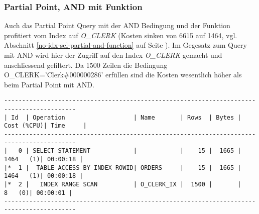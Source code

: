 \documentclass[11pt,a4paper,parskip=half]{scrartcl}
\begin{document}
\subsubsection{Partial Point, AND mit Funktion}
Auch das Partial Point Query mit der AND Bedingung und der Funktion profitiert vom  Index auf \emph{O\_CLERK} (Kosten sinken von 6615 auf 1464, vgl. Abschnitt \ref{no-idx-sel-partial-and-function} auf Seite \pageref{no-idx-sel-partial-and-function}). Im Gegesatz zum Query mit AND wird hier der Zugriff auf den Index \emph{O\_CLERK} gemacht und anschliessend gefiltert. Da 1500 Zeilen die Bedingung O\_CLERK='Clerk\#000000286' erfüllen sind die Kosten wesentlich höher als beim Partial Point mit AND.
\begin{lstlisting}
------------------------------------------------------------------------------------------                                                                                                                                                                                                                   
| Id  | Operation                   | Name       | Rows  | Bytes | Cost (%CPU)| Time     |                                                                                                                                                                                                                   
------------------------------------------------------------------------------------------                                                                                                                                                                                                                   
|   0 | SELECT STATEMENT            |            |    15 |  1665 |  1464   (1)| 00:00:18 |                                                                                                                                                                                                                   
|*  1 |  TABLE ACCESS BY INDEX ROWID| ORDERS     |    15 |  1665 |  1464   (1)| 00:00:18 |                                                                                                                                                                                                                   
|*  2 |   INDEX RANGE SCAN          | O_CLERK_IX |  1500 |       |     8   (0)| 00:00:01 |                                                                                                                                                                                                                   
------------------------------------------------------------------------------------------                                                                                                                                                                                                                   
                                                                                                                                                                                                                                                                                                             

\end{lstlisting}
\end{document}
